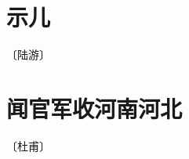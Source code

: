 \documentclass[12pt,UTF-8,openany]{ctexbook}
\begin{document}
\vspace{8pt}


\section{示儿}

\begin{center}
    \vspace{10pt}
    
    \begin{normalsize}
        
        〔陆游〕
        
    \end{normalsize}
    
    \vspace{8pt}
    
    \begin{large}
        
        
        
    \end{large}
    
\end{center}

\vspace{8pt}


\section{闻官军收河南河北}

\begin{center}
    \vspace{10pt}
    
    \begin{normalsize}
        
        〔杜甫〕
        
    \end{normalsize}
    
    \vspace{8pt}
    
    \begin{large}
        
        
        
        
        
    \end{large}
    
\end{center}
\end{document}
